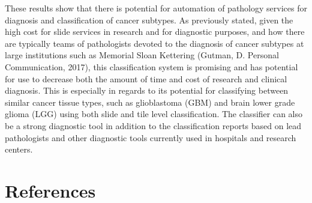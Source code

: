 \documentclass[12pt,]{article}
\begin{document}
These results show that there is potential for automation of pathology
services for diagnosis and classification of cancer subtypes. As
previously stated, given the high cost for slide services in research
and for diagnostic purposes, and how there are typically teams of
pathologists devoted to the diagnosis of cancer subtypes at large
institutions such as Memorial Sloan Kettering (Gutman, D. Personal
Communication, 2017), this classification system is promising and has
potential for use to decrease both the amount of time and cost of
research and clinical diagnosis. This is especially in regards to its
potential for classifying between similar cancer tissue types, such as
glioblastoma (GBM) and brain lower grade glioma (LGG) using both slide
and tile level classification. The classifier can also be a strong
diagnostic tool in addition to the classification reports based on lead
pathologists and other diagnostic tools currently used in hospitals and
research centers.

\newpage

\section{References}\label{references}
\end{document}
